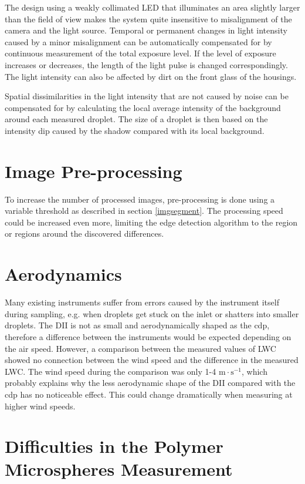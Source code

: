 The design using a weakly collimated LED that illuminates an area slightly larger than the field of view makes the system quite insensitive to misalignment of the camera and the light source. Temporal or permanent changes in light intensity caused by a minor misalignment can be automatically compensated for by continuous measurement of the total exposure level. If the level of exposure increases or decreases, the length of the light pulse is changed correspondingly. The light intensity can also be affected by dirt on the front glass of the housings. 

Spatial dissimilarities in the light intensity that are not caused by noise can be compensated for by calculating the local average intensity of the background around each measured droplet. The size of a droplet is then based on the intensity dip caused by the shadow compared with its local background.

\section{Image Pre-processing}

To increase the number of processed images, pre-processing is done using a variable threshold as described in section \ref{imgsegment}. The processing speed could be increased even more, limiting the edge detection algorithm to the region or regions around the discovered differences.

\section{Aerodynamics}

Many existing instruments suffer from errors caused by the instrument itself during sampling, e.g. when droplets get stuck on the inlet or shatters into smaller droplets. The DII is not as small and aerodynamically shaped as the \gls{cdp}, therefore a difference between the instruments would be expected depending on the air speed. However, a comparison between the measured values of LWC showed no connection between the wind speed and the difference in the measured LWC. The wind speed during the comparison was only 1-4 $\mathrm{m \cdot s^{-1}}$, which probably explains why the less aerodynamic shape of the DII compared with the \gls{cdp} has no noticeable effect. This could change dramatically when measuring at higher wind speeds.

\section{Difficulties in the Polymer Microspheres Measurement}

